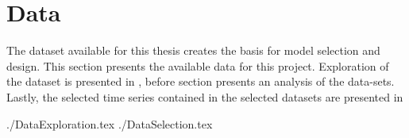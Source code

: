 \chapter{Data}
\label{section:Data}




The dataset available for this thesis creates the basis for model selection and design.
This section presents the available data for this project.
Exploration of the dataset is presented in ,
before section  presents an analysis of the data-sets.
Lastly, the selected time series contained in the selected datasets are presented in 

{./DataExploration.tex}
{./DataSelection.tex}
